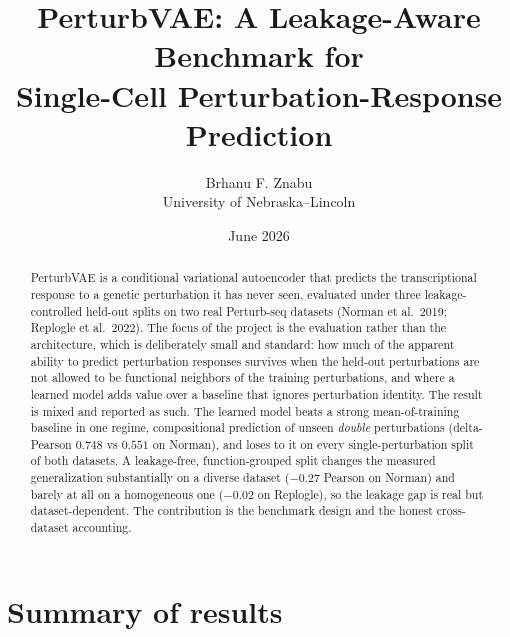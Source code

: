 \documentclass[11pt]{article}
\title{\textbf{PerturbVAE: A Leakage-Aware Benchmark for\\ Single-Cell Perturbation-Response Prediction}}
\author{Brhanu F. Znabu \\ \small University of Nebraska--Lincoln}
\date{June 2026}
\begin{document}
\maketitle

\begin{abstract}
\noindent
PerturbVAE is a conditional variational autoencoder that predicts the
transcriptional response to a genetic perturbation it has never seen, evaluated
under three leakage-controlled held-out splits on two real Perturb-seq datasets
(Norman et al.\ 2019; Replogle et al.\ 2022). The focus of the project is the
evaluation rather than the architecture, which is deliberately small and
standard: how much of the apparent ability to predict perturbation responses
survives when the held-out perturbations are not allowed to be functional
neighbors of the training perturbations, and where a learned model adds value
over a baseline that ignores perturbation identity. The result is mixed and
reported as such. The learned model beats a strong mean-of-training baseline in
one regime, compositional prediction of unseen \emph{double} perturbations
(delta-Pearson $0.748$ vs $0.551$ on Norman), and loses to it on every
single-perturbation split of both datasets. A leakage-free, function-grouped
split changes the measured generalization substantially on a diverse dataset
($-0.27$ Pearson on Norman) and barely at all on a homogeneous one ($-0.02$ on
Replogle), so the leakage gap is real but dataset-dependent. The contribution is
the benchmark design and the honest cross-dataset accounting.
\end{abstract}

\clearpage
\section{Summary of results}
\end{document}

